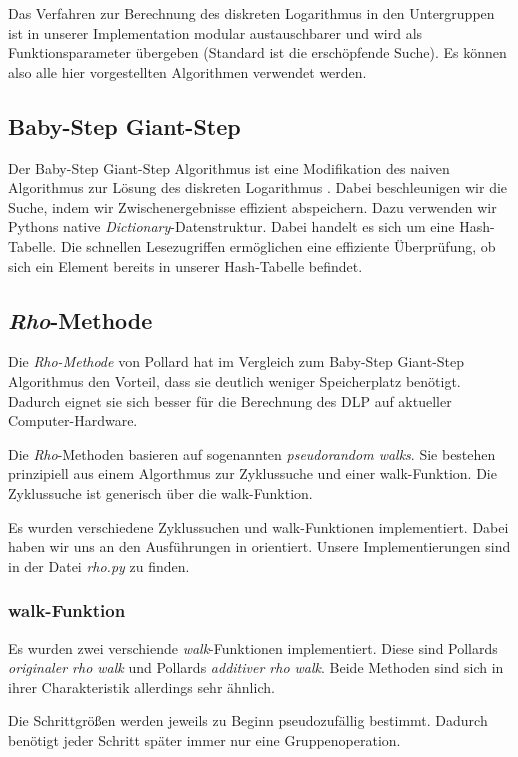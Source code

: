 \documentclass{scrartcl}
\begin{document}
Das Verfahren zur Berechnung des diskreten Logarithmus in den Untergruppen ist in unserer Implementation modular austauschbarer und wird als Funktionsparameter übergeben (Standard ist die erschöpfende Suche). Es können also alle hier vorgestellten Algorithmen verwendet werden.
\subsection{Baby-Step Giant-Step}
\label{sec:baby_step_giant_step}
Der Baby-Step Giant-Step Algorithmus ist eine Modifikation des naiven Algorithmus zur Lösung des diskreten Logarithmus  \cite{Galbraith2012}. Dabei beschleunigen wir die Suche, indem wir Zwischenergebnisse effizient abspeichern. Dazu verwenden wir Pythons native \emph{Dictionary}-Datenstruktur. Dabei handelt es sich um eine Hash-Tabelle. Die schnellen Lesezugriffen ermöglichen eine effiziente Überprüfung, ob sich ein Element bereits in unserer Hash-Tabelle befindet.
\subsection{\emph{Rho}-Methode}
\label{sec:rho}
Die \emph{Rho-Methode} von Pollard hat im Vergleich zum Baby-Step Giant-Step Algorithmus den Vorteil,
dass sie deutlich weniger Speicherplatz benötigt.
Dadurch eignet sie sich besser für die Berechnung des DLP auf aktueller Computer-Hardware.

Die \emph{Rho}-Methoden basieren auf sogenannten \emph{pseudorandom walks}.
Sie bestehen prinzipiell aus einem Algorthmus zur Zyklussuche
und einer walk-Funktion.
Die Zyklussuche ist generisch über die walk-Funktion.

Es wurden verschiedene Zyklussuchen und walk-Funktionen
implementiert.
Dabei haben wir uns an den Ausführungen in \cite{Galbraith2012}
orientiert.
Unsere Implementierungen sind in der Datei \emph{rho.py} zu finden.

\subsubsection{walk-Funktion}
\label{sec:walk_funktion}
Es wurden zwei verschiende \emph{walk}-Funktionen implementiert.
Diese sind Pollards \emph{originaler rho walk} und Pollards \emph{additiver rho walk}.
Beide Methoden sind sich in ihrer Charakteristik allerdings sehr ähnlich.

Die Schrittgrößen werden jeweils zu Beginn pseudozufällig bestimmt.
Dadurch benötigt jeder Schritt später immer nur eine Gruppenoperation.
\end{document}

